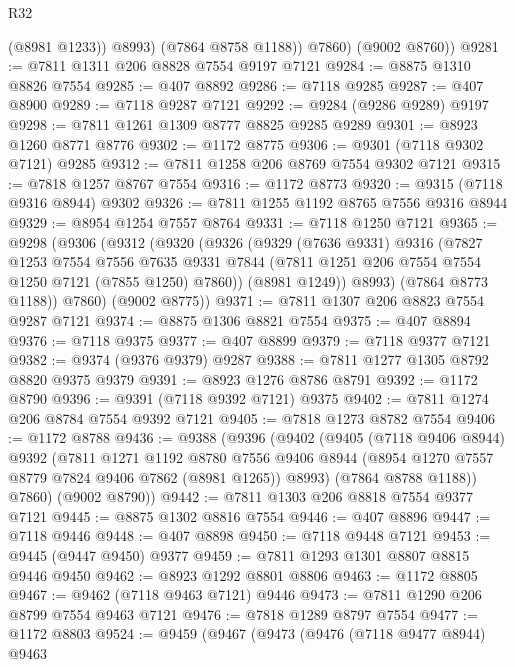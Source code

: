 \begin{lexlean}{R32}
\begin{coremodule}
              (@8981 @1233))
            @8993)
          (@7864 @8758 @1188))
        @7860)
      (@9002 @8760))
@9281 := @7811 @1311 @206 @8828 @7554 @9197 @7121
@9284 := @8875 @1310 @8826 @7554
@9285 := @407 @8892
@9286 := @7118 @9285
@9287 := @407 @8900
@9289 := @7118 @9287 @7121
@9292 := @9284 (@9286 @9289) @9197
@9298 := @7811 @1261 @1309 @8777 @8825 @9285 @9289
@9301 := @8923 @1260 @8771 @8776
@9302 := @1172 @8775
@9306 := @9301 (@7118 @9302 @7121) @9285
@9312 := @7811 @1258 @206 @8769 @7554 @9302 @7121
@9315 := @7818 @1257 @8767 @7554
@9316 := @1172 @8773
@9320 := @9315 (@7118 @9316 @8944) @9302
@9326 := @7811 @1255 @1192 @8765 @7556 @9316 @8944
@9329 := @8954 @1254 @7557 @8764
@9331 := @7118 @1250 @7121
@9365 := @9298
    (@9306
      (@9312
        (@9320
          (@9326
            (@9329
              (@7636 @9331)
              @9316
              (@7827
                @1253
                @7554
                @7556
                @7635
                @9331
                @7844
                (@7811 @1251 @206 @7554 @7554 @1250 @7121 (@7855 @1250) @7860))
              (@8981 @1249))
            @8993)
          (@7864 @8773 @1188))
        @7860)
      (@9002 @8775))
@9371 := @7811 @1307 @206 @8823 @7554 @9287 @7121
@9374 := @8875 @1306 @8821 @7554
@9375 := @407 @8894
@9376 := @7118 @9375
@9377 := @407 @8899
@9379 := @7118 @9377 @7121
@9382 := @9374 (@9376 @9379) @9287
@9388 := @7811 @1277 @1305 @8792 @8820 @9375 @9379
@9391 := @8923 @1276 @8786 @8791
@9392 := @1172 @8790
@9396 := @9391 (@7118 @9392 @7121) @9375
@9402 := @7811 @1274 @206 @8784 @7554 @9392 @7121
@9405 := @7818 @1273 @8782 @7554
@9406 := @1172 @8788
@9436 := @9388
    (@9396
      (@9402
        (@9405
          (@7118 @9406 @8944)
          @9392
          (@7811
            @1271
            @1192
            @8780
            @7556
            @9406
            @8944
            (@8954 @1270 @7557 @8779 @7824 @9406 @7862 (@8981 @1265))
            @8993)
          (@7864 @8788 @1188))
        @7860)
      (@9002 @8790))
@9442 := @7811 @1303 @206 @8818 @7554 @9377 @7121
@9445 := @8875 @1302 @8816 @7554
@9446 := @407 @8896
@9447 := @7118 @9446
@9448 := @407 @8898
@9450 := @7118 @9448 @7121
@9453 := @9445 (@9447 @9450) @9377
@9459 := @7811 @1293 @1301 @8807 @8815 @9446 @9450
@9462 := @8923 @1292 @8801 @8806
@9463 := @1172 @8805
@9467 := @9462 (@7118 @9463 @7121) @9446
@9473 := @7811 @1290 @206 @8799 @7554 @9463 @7121
@9476 := @7818 @1289 @8797 @7554
@9477 := @1172 @8803
@9524 := @9459
    (@9467
      (@9473
        (@9476
          (@7118 @9477 @8944)
          @9463

\end{coremodule}
\end{lexlean}
